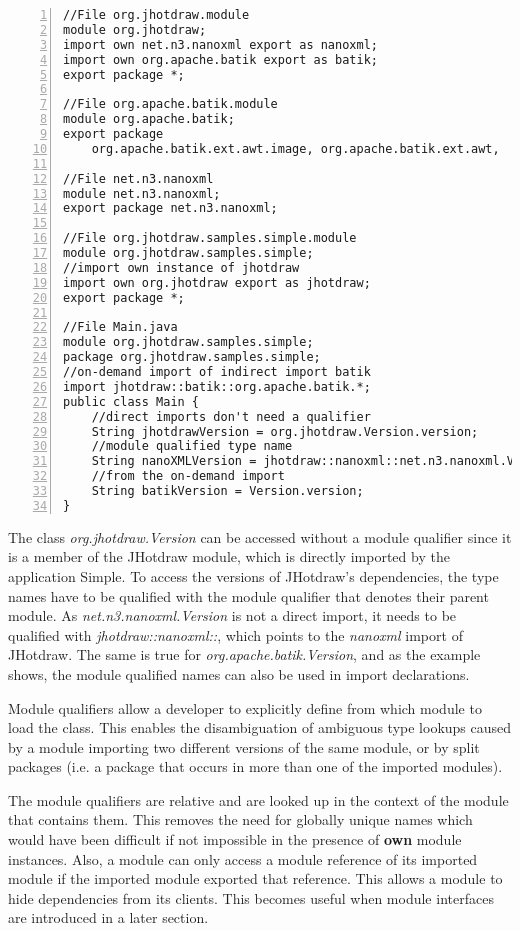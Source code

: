 \begin{lstlisting}[caption=Module Qualified Type References,numbers=left]
//File org.jhotdraw.module
module org.jhotdraw;
import own net.n3.nanoxml export as nanoxml;
import own org.apache.batik export as batik;
export package *;

//File org.apache.batik.module
module org.apache.batik;
export package 
	org.apache.batik.ext.awt.image,	org.apache.batik.ext.awt,	org.apache.batik;

//File net.n3.nanoxml
module net.n3.nanoxml;
export package net.n3.nanoxml;

//File org.jhotdraw.samples.simple.module
module org.jhotdraw.samples.simple;
//import own instance of jhotdraw
import own org.jhotdraw export as jhotdraw;
export package *;

//File Main.java
module org.jhotdraw.samples.simple;
package org.jhotdraw.samples.simple;
//on-demand import of indirect import batik
import jhotdraw::batik::org.apache.batik.*;
public class Main {
	//direct imports don't need a qualifier
	String jhotdrawVersion = org.jhotdraw.Version.version;
	//module qualified type name
	String nanoXMLVersion = jhotdraw::nanoxml::net.n3.nanoxml.Version.version;
	//from the on-demand import
	String batikVersion = Version.version;
}
\end{lstlisting}

The class \textit{org.jhotdraw.Version} can be accessed without
a module qualifier since it is a member of the JHotdraw module, 
which is directly imported by the application Simple. To access
the versions of JHotdraw's dependencies, the type names have to
be qualified with the module qualifier that denotes their parent
module. As \textit{net.n3.nanoxml.Version} is not a direct import,
it needs to be qualified with \textit{jhotdraw::nanoxml::}, which
points to the \textit{nanoxml} import of JHotdraw. The same is
true for \textit{org.apache.batik.Version}, and as the example shows,
the module qualified names can also be used in import declarations.

Module qualifiers allow a developer to explicitly define from which module
to load the class. This enables the disambiguation of ambiguous type
lookups caused by a module importing two different versions of the same module, or
by split packages (i.e. a package that occurs in more than one of the imported modules).

The module qualifiers are relative and are looked up in the context 
of the module that contains them. This removes the need for globally
unique names which would have been difficult if not impossible in the
presence of \textbf{own} module instances. Also, a module can only
access a module reference of its imported module if the imported module
exported that reference. This allows a module to hide dependencies from
its clients. This becomes useful when module interfaces are introduced
in a later section.

